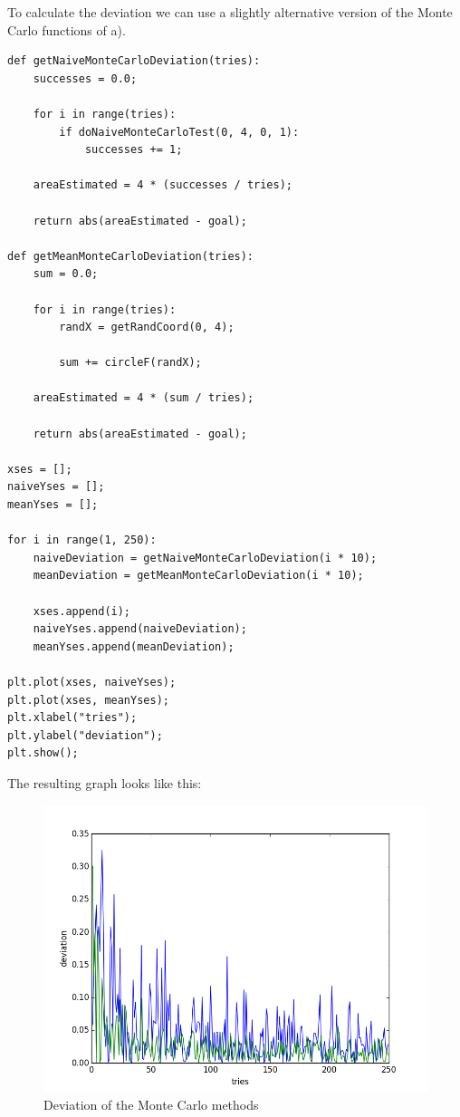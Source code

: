 To calculate the deviation we can use a slightly alternative version of the Monte Carlo functions of a).

\begin{lstlisting}[caption=Problem 7.13 b)]
def getNaiveMonteCarloDeviation(tries):
	successes = 0.0;
	
	for i in range(tries):
		if doNaiveMonteCarloTest(0, 4, 0, 1):
			successes += 1;
	
	areaEstimated = 4 * (successes / tries);
	
	return abs(areaEstimated - goal);

def getMeanMonteCarloDeviation(tries):
	sum = 0.0;
	
	for i in range(tries):
		randX = getRandCoord(0, 4);
		
		sum += circleF(randX);
	
	areaEstimated = 4 * (sum / tries);
	
	return abs(areaEstimated - goal);

xses = [];
naiveYses = [];
meanYses = [];

for i in range(1, 250):
	naiveDeviation = getNaiveMonteCarloDeviation(i * 10);
	meanDeviation = getMeanMonteCarloDeviation(i * 10);
	
	xses.append(i);
	naiveYses.append(naiveDeviation);
	meanYses.append(meanDeviation);

plt.plot(xses, naiveYses);
plt.plot(xses, meanYses);
plt.xlabel("tries");
plt.ylabel("deviation");
plt.show();
\end{lstlisting}

\newpage

The resulting graph looks like this:

\begin{figure}[!ht]
\includegraphics[width=1\textwidth]{chapters/images/figure-7-12-b}
\caption{Deviation of the Monte Carlo methods}
\end{figure}

